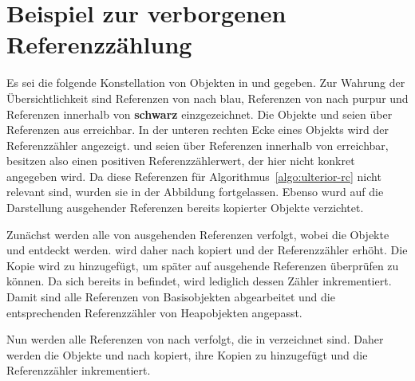 \chapter{Beispiel zur verborgenen Referenzzählung}
\label{cha:ulterior-example}

Es sei die folgende Konstellation von Objekten in \Nursery und \Mature gegeben.
Zur Wahrung der Übersichtlichkeit sind Referenzen von \Nursery nach \Mature \textcolor{ctcolormain}{blau}, Referenzen von \Mature nach \Nursery \textcolor{ctcoloraccessory}{purpur} und Referenzen innerhalb von \Nursery \textbf{schwarz} einzgezeichnet.
Die Objekte  und  seien über Referenzen aus \Roots erreichbar.
In der unteren rechten Ecke eines Objekts wird der Referenzzähler angezeigt.
 und  seien über Referenzen innerhalb von \Mature erreichbar, besitzen also einen positiven Referenzzählerwert, der hier nicht konkret angegeben wird.
Da diese Referenzen für Algorithmus~\ref{algo:ulterior-rc} nicht relevant sind, wurden sie in der Abbildung fortgelassen.
Ebenso wurd auf die Darstellung ausgehender Referenzen bereits kopierter Objekte verzichtet.

\begin{center}
	
\end{center}

Zunächst werden alle von \Roots ausgehenden Referenzen verfolgt, wobei die Objekte  und  entdeckt werden.
 wird daher nach \Mature kopiert und der Referenzzähler erhöht.
Die Kopie  wird zu  hinzugefügt, um später  auf ausgehende Referenzen überprüfen zu können.
Da sich  bereits in \Mature befindet, wird lediglich dessen Zähler inkrementiert.
Damit sind alle Referenzen von Basisobjekten abgearbeitet und die entsprechenden Referenzzähler von Heapobjekten angepasst.

\begin{center}
	
\end{center}

Nun werden alle Referenzen von \Mature nach \Nursery verfolgt, die in  verzeichnet sind.
Daher werden die Objekte  und  nach \Mature kopiert, ihre Kopien zu  hinzugefügt und die Referenzzähler inkrementiert.

\begin{center}
	
	
	
\end{center}

